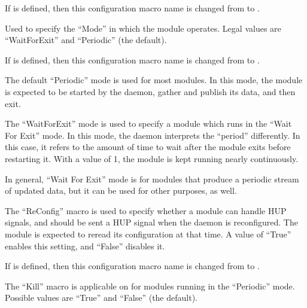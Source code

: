 \begin{description}
    If 
    is defined, then this configuration macro name is changed from
     to
    .


\item[\Macro{STARTD\_CRON\_<ModuleName>\_MODE}]
\label{param:StartdCronModuleMode}
    Used to specify the ``Mode'' in which the module operates.
    Legal values are ``WaitForExit'' and ``Periodic'' (the
    default).  

    If 
    is defined, then this configuration macro name is changed from
     to
    .

    The default ``Periodic'' mode is used for most modules.  In
    this mode, the module is expected to be started by the
     daemon, gather and publish its data, and then
    exit.

    The ``WaitForExit'' mode is used to specify a module
    which runs in the ``Wait For Exit'' mode.
    In this mode, the  daemon
    interprets the ``period'' differently.  In this case, it
    refers to the amount of time to wait after the module exits
    before restarting it.  With a value of 1, the module is kept
    running nearly continuously.

    In general, ``Wait For Exit'' mode is for modules that produce
    a periodic stream of updated data, but it can be used for other
    purposes, as well.


\item[\Macro{STARTD\_CRON\_<ModuleName>\_RECONFIG}]
\label{param:StartdCronModuleReconfig}
    The ``ReConfig'' macro is used to specify whether a module
    can handle HUP signals, and should be sent a HUP signal when
    the  daemon is reconfigured.  The module is
    expected to reread its configuration at that time.  A value
    of ``True'' enables this setting, and ``False'' disables it.

    If 
    is defined, then this configuration macro name is changed from
     to
    .

\item[\Macro{STARTD\_CRON\_<ModuleName>\_KILL}]
\label{param:StartdCronModuleKill}
    The ``Kill'' macro is applicable on for modules running in the
    ``Periodic'' mode.  Possible values are ``True'' and ``False'' (the
    default).


\end{description}
